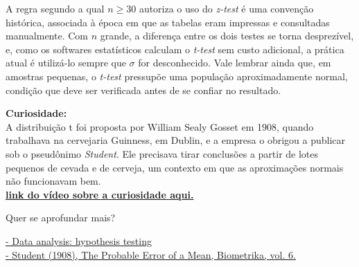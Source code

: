 {\subtitle{Uma ressalva importante}

\hspace*{1.5em}
A regra segundo a qual $n \geq 30$ autoriza o uso do \textit{z-test} é uma convenção histórica,
associada à época em que as tabelas eram impressas e consultadas manualmente.
Com $n$ grande, a diferença entre os dois testes se torna desprezível,
e, como os softwares estatísticos calculam o \textit{t-test} sem custo adicional,
a prática atual é utilizá-lo sempre que $\sigma$ for desconhecido.
Vale lembrar ainda que, em amostras pequenas, o \textit{t-test} pressupõe uma população aproximadamente normal,
condição que deve ser verificada antes de se confiar no resultado.

\begin{infobox}
\textbf{Curiosidade:}\\
A distribuição t foi proposta por William Sealy Gosset em 1908,
quando trabalhava na cervejaria Guinness, em Dublin,
e a empresa o obrigou a publicar sob o pseudônimo \textit{Student}.
Ele precisava tirar conclusões a partir de lotes pequenos de cevada e de cerveja,
um contexto em que as aproximações normais não funcionavam bem.\\
\textbf{\href{https://www.instagram.com/p/Dexi6WNFQJu/}{link do vídeo sobre a curiosidade aqui.}}
\end{infobox}

\vspace{0.1em}
{\color{HypePurple2} Quer se aprofundar mais?}

\href{https://www.open.edu/openlearn/science-maths-technology/data-analysis-hypothesis-testing/content-section-6.1}{- Data analysis: hypothesis testing} \\
\href{https://www.jstor.org/stable/2331554?origin=crossref}{- Student (1908), The Probable Error of a Mean, Biometrika, vol. 6.}

}